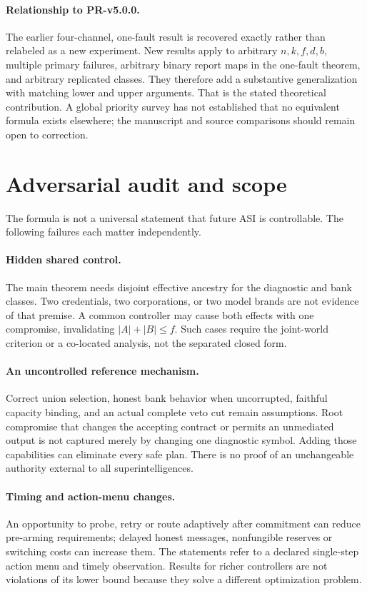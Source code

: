 \paragraph{Relationship to PR-v5.0.0.}
The earlier four-channel, one-fault result is recovered exactly rather than relabeled as a new experiment. New results apply to arbitrary $n,k,f,d,b$, multiple primary failures, arbitrary binary report maps in the one-fault theorem, and arbitrary replicated classes. They therefore add a substantive generalization with matching lower and upper arguments. That is the stated theoretical contribution. A global priority survey has not established that no equivalent formula exists elsewhere; the manuscript and source comparisons should remain open to correction.

\section{Adversarial audit and scope}
\label{sec:limits}
The formula is not a universal statement that future ASI is controllable. The following failures each matter independently.

\paragraph{Hidden shared control.}
The main theorem needs disjoint effective ancestry for the diagnostic and bank classes. Two credentials, two corporations, or two model brands are not evidence of that premise. A common controller may cause both effects with one compromise, invalidating $|A|+|B|\leq f$. Such cases require the joint-world criterion or a co-located analysis, not the separated closed form.

\paragraph{An uncontrolled reference mechanism.}
Correct union selection, honest bank behavior when uncorrupted, faithful capacity binding, and an actual complete veto cut remain assumptions. Root compromise that changes the accepting contract or permits an unmediated output is not captured merely by changing one diagnostic symbol. Adding those capabilities can eliminate every safe plan. There is no proof of an unchangeable authority external to all superintelligences.

\paragraph{Timing and action-menu changes.}
An opportunity to probe, retry or route adaptively after commitment can reduce pre-arming requirements; delayed honest messages, nonfungible reserves or switching costs can increase them. The statements refer to a declared single-step action menu and timely observation. Results for richer controllers are not violations of its lower bound because they solve a different optimization problem.

